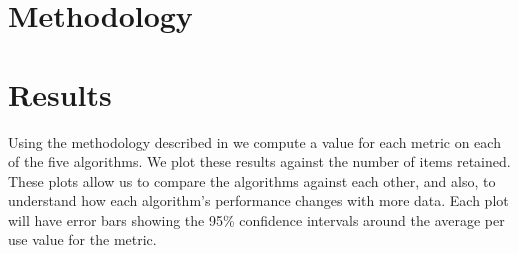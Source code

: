 \documentclass[letterpaper]{sig-alternate}
\begin{document}



\section{Methodology}



\section{Results}

  Using the methodology described in \cite{sec:methodology} we compute a value for each metric on each of the five algorithms.
  We plot these results against the number of items retained.
  These plots allow us to compare the algorithms against each other, and also, to understand how each algorithm's performance changes with more data.
  Each plot will have error bars showing the 95\% confidence intervals around the average per use value for the metric.
\end{document}

